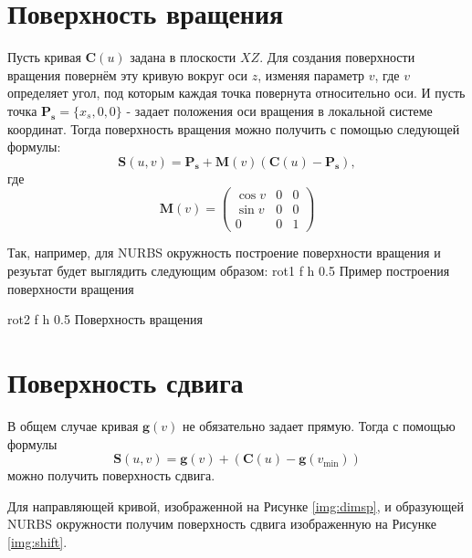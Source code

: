 \documentclass{bmstu}
\begin{document}
\newpage
\section{Поверхность вращения}
Пусть кривая $\mathbf{C}(u)$ задана в плоскости $XZ$. Для создания поверхности вращения повернём эту кривую вокруг оси $z$, изменяя параметр $v$, где $v$ определяет угол, под которым каждая точка повернута относительно оси. И пусть точка $\mathbf{P_s} = \{x_s, 0,0\}$ - задает положения оси вращения в локальной системе координат. Тогда поверхность вращения можно получить с помощью следующей формулы:
\begin{equation}
    \mathbf{S}(u,v) = \mathbf{P_s}+\mathbf{M}(v)(\mathbf{C}(u)-\mathbf{P_s}),
\end{equation}
где 
\begin{equation}
    \mathbf{M}(v) = \left(
        \begin{matrix}
            \cos{v} & 0 & 0\\
            \sin{v} & 0 & 0\\
            0 & 0 & 1
        \end{matrix}
    \right)
\end{equation}

Так, например, для NURBS окружность построение поверхности вращения и резуьтат будет выглядить следующим образом:
{rot1} %
{f} %
{h} %
{0.5\textwidth} %
{Пример построения поверхности вращения} %

{rot2} %
{f} %
{h} %
{0.5\textwidth} %
{Поверхность вращения} %

\section{Поверхность сдвига}
В общем случае кривая $\mathbf{g}(v)$ не обязательно задает прямую. Тогда с помощью формулы
\begin{equation}
    \mathbf{S}(u,v)=\mathbf{g}(v) + (\mathbf{C}(u)-\mathbf{g}(v_{\min}))
\end{equation}
можно получить поверхность сдвига.

Для направляющей кривой, изображенной на Рисунке \ref{img:dimsp}, и образующей NURBS окружности получим поверхность сдвига изображенную на Рисунке \ref{img:shift}.
\end{document}
